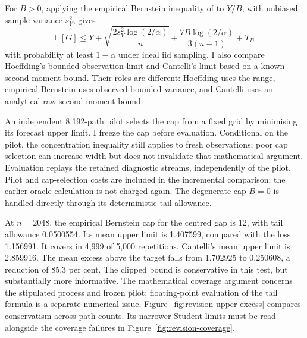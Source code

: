 \documentclass[11pt]{article}
\newcommand{\E}{\mathbb E}
\begin{document}
For $B>0$, applying the empirical Bernstein inequality of \citet[Theorem~4]{maurer2009} to $Y/B$, with unbiased sample variance $s_Y^2$, gives
\begin{equation}
 \E[G]\leq\bar Y+
 \sqrt{\frac{2s_Y^2\log(2/\alpha)}{n}}+
 \frac{7B\log(2/\alpha)}{3(n-1)}+T_B
\label{eq:eb}
\end{equation}
with probability at least $1-\alpha$ under ideal iid sampling. I also compare Hoeffding's bounded-observation limit and Cantelli's limit based on a known second-moment bound. Their roles are different: Hoeffding uses the range, empirical Bernstein uses observed bounded variance, and Cantelli uses an analytical raw second-moment bound.

An independent 8,192-path pilot selects the cap from a fixed grid by minimising its forecast upper limit. I freeze the cap before evaluation. Conditional on the pilot, the concentration inequality still applies to fresh observations; poor cap selection can increase width but does not invalidate that mathematical argument. Evaluation replays the retained diagnostic streams, independently of the pilot. Pilot and cap-selection costs are included in the incremental comparison; the earlier oracle calculation is not charged again. The degenerate cap $B=0$ is handled directly through its deterministic tail allowance.

At $n=2048$, the empirical Bernstein cap for the centred gap is 12, with tail allowance 0.0500554. Its mean upper limit is 1.407599, compared with the loss 1.156991. It covers in 4,999 of 5,000 repetitions. Cantelli's mean upper limit is 2.859916. The mean excess above the target falls from 1.702925 to 0.250608, a reduction of 85.3 per cent. The clipped bound is conservative in this test, but substantially more informative. The mathematical coverage argument concerns the stipulated process and frozen pilot; floating-point evaluation of the tail formula is a separate numerical issue. Figure~\ref{fig:revision-upper-excess} compares conservatism across path counts. Its narrower Student limits must be read alongside the coverage failures in Figure~\ref{fig:revision-coverage}.
\end{document}
